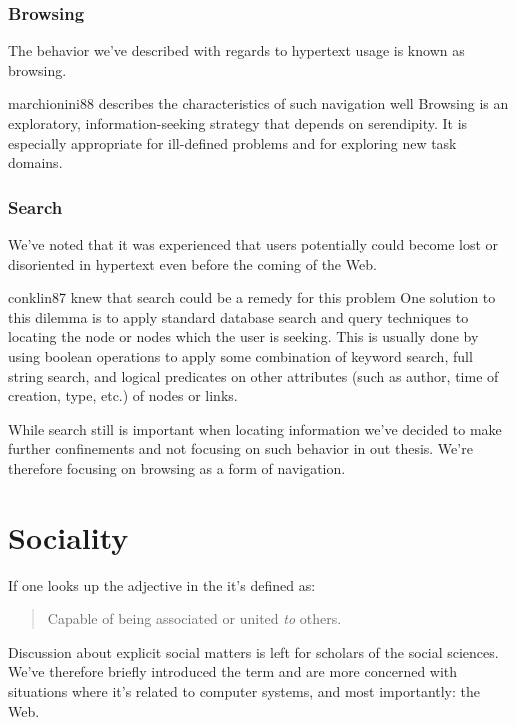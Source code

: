\subsubsection{Browsing}
The behavior we've described with regards to hypertext usage is known as
browsing.
\begin{fullquote}[\p{71}]{marchionini88}{%
  describes the characteristics of such navigation well}
    Browsing is an exploratory, information-seeking
    strategy that depends on serendipity. It is
    especially appropriate for ill-defined problems
    and for exploring new task domains.
\end{fullquote}

\subsubsection{Search}
\label{section:background.navigation.navigation.on.the.web.search}
We've noted that it was experienced that users potentially could become lost
or disoriented in hypertext even before the coming of the Web.
\begin{fullquote}[\p{38}]{conklin87}{%
  knew that search could be a remedy for this problem}
    One solution to this dilemma is to apply standard data\-base search and
    query techniques to locating the node or nodes which the user is seeking.
    This is usually done by using boolean operations to apply some combination
    of keyword search, full string search, and logical predicates on other
    attributes (such as author, time of creation, type, etc.)
    of nodes or links.
\end{fullquote}

While search still is important when locating information we've decided
to make further confinements and not focusing on such behavior in out thesis.
We're therefore focusing on browsing as a form of navigation.

\section{Sociality}

If one looks up the adjective  in the
 \citep[]{simpson89}
it's defined as:

\begin{quote}
  Capable of being associated or united \emph{to} others.
\end{quote}

Discussion about explicit social matters is left for scholars of the social
sciences. We've therefore briefly introduced the term and are more concerned
with situations where it's related to computer systems, and most importantly:
the Web.

